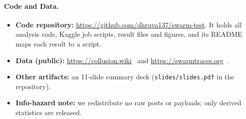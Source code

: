 \documentclass[10.5pt]{article}
\begin{document}
\paragraph{Code and Data.}
\begin{itemize}
\item \textbf{Code repository:} \url{https://github.com/dhruva137/swarm-test}. It holds all analysis code, Kaggle job scripts, result files and figures, and its README maps each result to a script.
\item \textbf{Data (public):} \url{https://collusion.wiki}~\cite{collusionwiki2026} and \url{https://swarmtraces.org}~\cite{forman2026swarmtraces}.
\item \textbf{Other artifacts:} an 11-slide summary deck (\texttt{slides/slides.pdf} in the repository).
\item \textbf{Info-hazard note:} we redistribute no raw posts or payloads; only derived statistics are released.
\end{itemize}




\appendix
\end{document}
